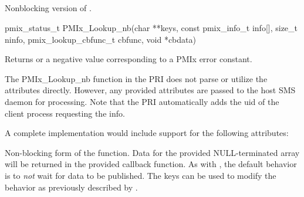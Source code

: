 \subsection{}

\summary

Nonblocking version of .

\format

\cspecificstart
\begin{codepar}
pmix_status_t
PMIx_Lookup_nb(char **keys,
               const pmix_info_t info[], size_t ninfo,
               pmix_lookup_cbfunc_t cbfunc, void *cbdata)
\end{codepar}
\cspecificend

\begin{arglist}
\end{arglist}

Returns  or a negative value corresponding to a PMIx error constant.

\priattr
The PMIx_Lookup_nb function in the \ac{PRI} does not parse or utilize the attributes directly. However, any provided attributes are passed to the host \ac{SMS} daemon for processing. Note that the \ac{PRI} automatically adds the uid of the client process requesting the info.

\optattr
A complete implementation would include support for the following attributes:



\descr

Non-blocking form of the  function.
Data for the provided NULL-terminated  array will be returned in the provided callback function.
As with , the default behavior is to \emph{not} wait for data to be published.
The  keys can be used to modify the behavior as previously described by .


\subsection{}

